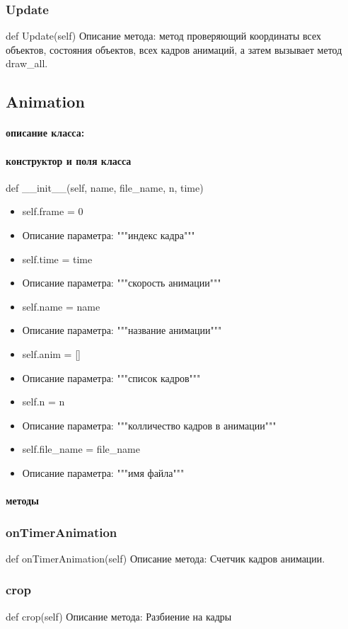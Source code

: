 \subsubsection{Update}
def Update(self)
Описание метода: метод проверяющий координаты всех объектов, состояния объектов, всех кадров анимаций, а затем вызывает метод draw\_all.

\subsection{Animation}
\paragraph{описание класса:}
\paragraph{конструктор и поля класса}
def \_\_init\_\_(self, name, file\_name, n, time)
\begin{itemize}
	\item self.frame = 0
	\item Описание параметра: """индекс кадра"""
	\item self.time = time
	\item Описание параметра: """скорость анимации"""
	\item self.name = name
	\item Описание параметра: """название анимации"""
	\item self.anim = []
	\item Описание параметра: """список кадров"""
	\item self.n = n
	\item Описание параметра: """колличество кадров в анимации"""
	\item self.file\_name = file\_name
	\item Описание параметра: """имя файла"""
\end{itemize}
\paragraph{методы}
\subsubsection{onTimerAnimation}
def onTimerAnimation(self)
Описание метода: Счетчик кадров анимации.
\subsubsection{crop}
def crop(self)
Описание метода: Разбиение на кадры
